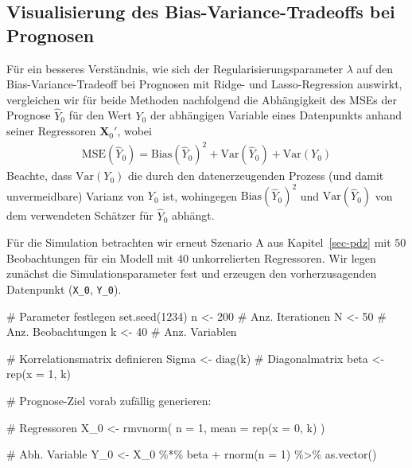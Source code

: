 \documentclass[
  a4paper,
  DIV=11,
  oneside]{scrreprt}
\newenvironment{Shaded}{\begin{snugshade}}{\end{snugshade}}
\newcommand{\AttributeTok}[1]{\textcolor[rgb]{0.40,0.45,0.13}{#1}}
\newcommand{\CommentTok}[1]{\textcolor[rgb]{0.37,0.37,0.37}{#1}}
\newcommand{\DecValTok}[1]{\textcolor[rgb]{0.68,0.00,0.00}{#1}}
\newcommand{\FunctionTok}[1]{\textcolor[rgb]{0.28,0.35,0.67}{#1}}
\newcommand{\NormalTok}[1]{\textcolor[rgb]{0.00,0.23,0.31}{#1}}
\newcommand{\OtherTok}[1]{\textcolor[rgb]{0.00,0.23,0.31}{#1}}
\newcommand{\SpecialCharTok}[1]{\textcolor[rgb]{0.37,0.37,0.37}{#1}}
\begin{document}
\hypertarget{visualisierung-des-bias-variance-tradeoffs-bei-prognosen}{%
\subsection{Visualisierung des Bias-Variance-Tradeoffs bei
Prognosen}\label{visualisierung-des-bias-variance-tradeoffs-bei-prognosen}}

Für ein besseres Verständnis, wie sich der Regularisierungsparameter
\(\lambda\) auf den Bias-Variance-Tradeoff bei Prognosen mit Ridge- und
Lasso-Regression auswirkt, vergleichen wir für beide Methoden
nachfolgend die Abhängigkeit des MSEs der Prognose \(\widehat{Y}_0\) für
den Wert \(Y_0\) der abhängigen Variable eines Datenpunkts anhand seiner
Regressoren \(\boldsymbol{X}_0'\), wobei \begin{align}
  \text{MSE}(\widehat{Y}_0) = \text{Bias}(\widehat{Y}_0)^2 + \text{Var}(\widehat{Y}_0) + \text{Var}(Y_0) \label{eq:pbvdecomp}
\end{align} Beachte, dass \(\text{Var}(Y_0)\) die durch den
datenerzeugenden Prozess (und damit unvermeidbare) Varianz von \(Y_0\)
ist, wohingegen \(\text{Bias}(\widehat{Y}_0)^2\) und
\(\text{Var}(\widehat{Y}_0)\) von dem verwendeten Schätzer für
\(\widehat{Y}_0\) abhängt.

Für die Simulation betrachten wir erneut Szenario A aus
Kapitel~\ref{sec-pdz} mit \(50\) Beobachtungen für ein Modell mit \(40\)
unkorrelierten Regressoren. Wir legen zunächst die Simulationsparameter
fest und erzeugen den vorherzusagenden Datenpunkt (\texttt{X\_0},
\texttt{Y\_0}).

\begin{Shaded}
\begin{Highlighting}[]
\CommentTok{\# Parameter festlegen}
\FunctionTok{set.seed}\NormalTok{(}\DecValTok{1234}\NormalTok{)}
\NormalTok{n }\OtherTok{\textless{}{-}} \DecValTok{200} \CommentTok{\# Anz. Iterationen}
\NormalTok{N }\OtherTok{\textless{}{-}} \DecValTok{50}  \CommentTok{\# Anz. Beobachtungen}
\NormalTok{k }\OtherTok{\textless{}{-}} \DecValTok{40}  \CommentTok{\# Anz. Variablen}

\CommentTok{\# Korrelationsmatrix definieren}
\NormalTok{Sigma }\OtherTok{\textless{}{-}} \FunctionTok{diag}\NormalTok{(k) }\CommentTok{\# Diagonalmatrix}
\NormalTok{beta }\OtherTok{\textless{}{-}} \FunctionTok{rep}\NormalTok{(}\AttributeTok{x =} \DecValTok{1}\NormalTok{, k)}

\CommentTok{\# Prognose{-}Ziel vorab zufällig generieren:}

\CommentTok{\# Regressoren}
\NormalTok{X\_0 }\OtherTok{\textless{}{-}} \FunctionTok{rmvnorm}\NormalTok{(}
  \AttributeTok{n =} \DecValTok{1}\NormalTok{, }
  \AttributeTok{mean =} \FunctionTok{rep}\NormalTok{(}\AttributeTok{x =} \DecValTok{0}\NormalTok{, k)}
\NormalTok{)}

\CommentTok{\# Abh. Variable}
\NormalTok{Y\_0 }\OtherTok{\textless{}{-}}\NormalTok{ X\_0 }\SpecialCharTok{\%*\%}\NormalTok{ beta }\SpecialCharTok{+} \FunctionTok{rnorm}\NormalTok{(}\AttributeTok{n =} \DecValTok{1}\NormalTok{) }\SpecialCharTok{\%\textgreater{}\%} 
  \FunctionTok{as.vector}\NormalTok{()}
\end{Highlighting}
\end{Shaded}
\end{document}
